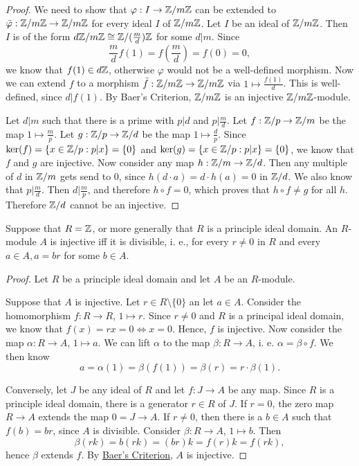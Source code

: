 \begin{proof}
	We need to show that $\varphi: I \rightarrow {\mathbb Z}/m{\mathbb Z}$ can be extended to $\bar{\varphi}: {\mathbb Z}/m{\mathbb Z} \rightarrow {\mathbb Z}/m{\mathbb Z}$ for every ideal $I$ of ${\mathbb Z}/m{\mathbb Z}$.
	Let $I$ be an ideal of ${\mathbb Z}/m{\mathbb Z}$.
	Then $I$ is of the form $d{\mathbb Z}/m{\mathbb Z} \cong {\mathbb Z}/(\frac{m}{d}){\mathbb Z}$ for some $d \vert m$.
	Since \[\frac{m}{d}f(1) = f(\frac{m}{d}) = f(0) = 0,\]
	we know that $f(1) \in d{\mathbb Z}$, otherwise $\varphi$ would not be a well-defined morphism.
	Now we can extend $f$ to a morphism $\bar{f}: {\mathbb Z}/m{\mathbb Z} \rightarrow {\mathbb Z}/m{\mathbb Z}$ via $1 \mapsto \frac{f(1)}{d}$.
	This is well-defined, since $d \vert f(1)$.
	By Baer's Criterion, ${\mathbb Z}/m{\mathbb Z}$ is an injective ${\mathbb Z}/m{\mathbb Z}$-module.
	
	Let $d\vert m$ such that there is a prime with $p \vert d$ and $p \vert \frac{m}{d}$.
	Let $f: {\mathbb Z}/p \rightarrow {\mathbb Z}/m$ be the map $1 \mapsto \frac{m}{p}$.
	Let $g: {\mathbb Z}/p \rightarrow {\mathbb Z}/d$ be the map $1 \mapsto \frac{d}{p}$.
	Since $\ker(f) = \{x \in {\mathbb Z}/p : p \vert x\} = \{0\}$ and $\ker(g) = \{x \in {\mathbb Z}/p : p \vert x\} = \{0\}$, we know that $f$ and $g$ are injective.
	Now consider any map $h: {\mathbb Z}/m \rightarrow {\mathbb Z}/d$.
	Then any multiple of $d$ in ${\mathbb Z}/m$ gets send to $0$, since $h(d\cdot a) = d \cdot h(a) = 0$ in ${\mathbb Z}/d$.
	We also know that $p \vert \frac{m}{d}$.
	Then $d \vert \frac{m}{p}$, and therefore $h\circ f= 0$, which proves that $h\circ f \neq g$ for all $h$.
	Therefore ${\mathbb Z}/d$ cannot be an injective.
\end{proof}

\begin{corollary}
	Suppose that $R={\mathbb Z}$, or more generally that $R$ is a principle ideal domain. An $R$-module $A$ is injective iff it is divisible, i. e., for every $r\neq0$ in $R$ and every $a\in A, a=br$ for some $b\in A$.
\end{corollary}

\begin{proof}
	Let $R$ be a principle ideal domain and let $A$ be an $R$-module.
	
	Suppose that $A$ is injective.
	Let $r \in R\setminus\{0\}$ an let $a \in A$.
	Consider the homomorphism $f: R \rightarrow R$, $1 \mapsto r$.
	Since $r\neq0$ and $R$ is a principal ideal domain, we know that $f(x) = rx  = 0 \iff x = 0$.
	Hence, $f$ is injective.
	Now consider the map $\alpha: R \rightarrow A$, $1 \mapsto a$.
	We can lift $\alpha$ to the map $\beta: R \rightarrow A$, i. e. $\alpha = \beta\circ f$.
	We then know
	\[a = \alpha(1) = \beta(f(1)) = \beta(r) = r \cdot \beta(1).\]
	
	Conversely, let $J$ be any ideal of $R$ and let $f: J \rightarrow A$ be any map.
	Since $R$ is a principle ideal domain, there is a generator $r \in R$ of $J$.
	If $r=0$, the zero map $R \rightarrow A$ extends the map $0 = J \rightarrow A$.
	If $r \neq 0$, then there is a $b \in A$ such that $f(b) = br$, since $A$ is divisible.
	Consider $\beta: R \rightarrow A$, $1 \mapsto b$.
	Then \[\beta(rk) = b(rk) = (br)k = f(r)k = f(rk),\] hence $\beta$ extends $f$.
	By \hyperref[baer]{Baer's Criterion}, $A$ is injective.
\end{proof}

